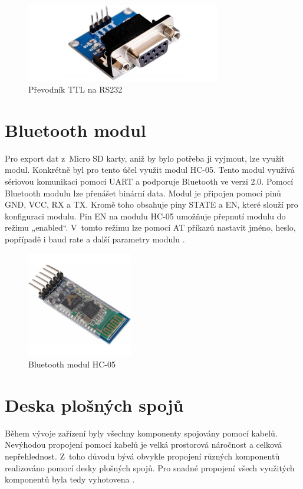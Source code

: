 \begin{figure}[H]
	\centering
	\includegraphics[width=8.5cm]{images/komponenty/prevodnik.jpg}
	\caption{Převodník TTL na RS232 \cite{laskakit_web}}
\end{figure}

\section{Bluetooth modul}
Pro export dat z~Micro SD karty, aniž by bylo potřeba ji vyjmout, lze využít  modul. Konkrétně byl pro tento účel využit modul HC-05. Tento modul využívá sériovou komunikaci pomocí UART a podporuje Bluetooth ve verzi 2.0. Pomocí Bluetooth modulu lze přenášet binární data. Modul je připojen pomocí pinů GND, VCC, RX a TX. Kromě toho obsahuje piny STATE a EN, které slouží pro konfiguraci modulu. Pin EN na modulu HC-05 umožňuje přepnutí modulu do režimu „enabled“. V~tomto režimu lze pomocí AT příkazů nastavit jméno, heslo, popřípadě i baud rate a další parametry modulu \cite{arduino_navody}.

\begin{figure}[H]
	\centering
	\includegraphics[width=4.6cm]{images/komponenty/BLUETOOTH-HC05.jpg}
	\caption{Bluetooth modul HC-05 \cite{dratek_web}}
\end{figure}

\section{Deska plošných spojů}
Během vývoje zařízení byly všechny komponenty spojovány pomocí kabelů. Nevýho\-dou propojení pomocí kabelů je velká prostorová náročnost a celková nepřehlednost. Z~toho důvodu bývá obvykle propojení různých komponentů realizováno pomocí desky plošných spojů. Pro snadné propojení všech využitých komponentů byla tedy vyhotovena .

